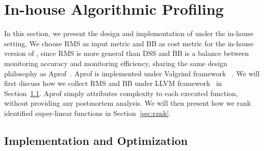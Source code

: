\section{In-house Algorithmic Profiling}
\label{sec:in-house}

In this section, we present the design and implementation 
of \Tool under the in-house setting. 
We choose RMS as input metric and BB as cost 
metric for the in-house version of \Tool, 
since RMS is more general than DSS and BB is a balance 
between monitoring accuracy and monitoring efficiency, 
sharing the same design philosophy as Aprof~\cite{Aprof1,Aprof2}.
Aprof is implemented under Valgrind framework~\cite{valgrind} .
We will first discuss how we collect RMS and BB under LLVM 
framework~\cite{llvm} in Section~\ref{sec:inhouse_impl}.
Aprof simply attributes complexity to each executed function, 
without providing any postmortem analysis. 
We will then present how we rank identified super-linear 
functions in Section~\ref{sec:rank}. 


\subsection{Implementation and Optimization}
\label{sec:inhouse_impl}


